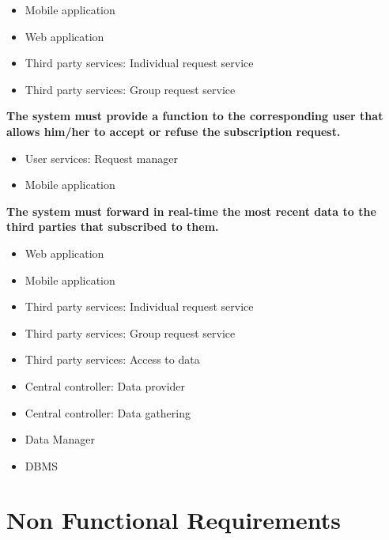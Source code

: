 \begin{enumerate} [label={\bf[R\arabic*]}]
        \begin{itemize}
            \item Mobile application
            \item Web application
            \item Third party services: Individual request service
            \item Third party services: Group request service
        \end{itemize}
    \item \textbf{The system must provide a function to the corresponding user that allows him/her to accept or refuse the subscription request.}
        \begin{itemize}
            \item User services: Request manager
            \item Mobile application
        \end{itemize}
    \item \textbf{The system must forward in real-time the most recent data to the third parties that subscribed to them.}   
        \begin{itemize}
            \item Web application
            \item Mobile application
            \item Third party services: Individual request service
            \item Third party services: Group request service
            \item Third party services: Access to data
            \item Central controller: Data provider
            \item Central controller: Data gathering
            \item Data Manager
            \item DBMS
        \end{itemize}
\end{enumerate}

\section{Non Functional Requirements}
